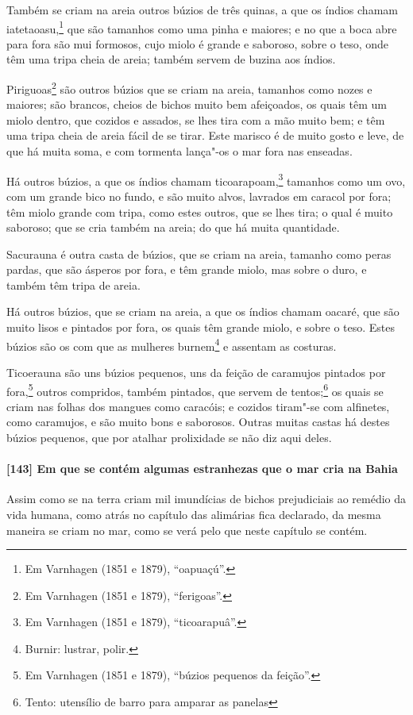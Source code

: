 Também se criam na areia outros búzios de três quinas, a que os índios chamam
iatetaoasu,\footnote{ Em Varnhagen (1851 e 1879), ``oapuaçú''.} que são tamanhos como uma
pinha e maiores; e no que a boca abre para fora são mui formosos, cujo miolo é grande e
saboroso, sobre o teso, onde têm uma tripa cheia de areia; também servem de buzina aos
índios.

Piriguoas\footnote{ Em Varnhagen (1851 e 1879), ``ferigoas''.} são outros búzios que se
criam na areia, tamanhos como nozes e maiores; são brancos, cheios de bichos muito bem
afeiçoados, os quais têm um miolo dentro, que cozidos e assados, se lhes tira com a mão
muito bem; e têm uma tripa cheia de areia fácil de se tirar. Este marisco é de muito gosto
e leve, de que há muita soma, e com tormenta lança"-os o mar fora nas enseadas.

Há outros búzios, a que os índios chamam ticoarapoam,\footnote{ Em Varnhagen (1851 e 1879),
``ticoarapuâ''.} tamanhos como um ovo, com um grande bico no fundo, e são muito alvos,
lavrados em caracol por fora; têm miolo grande com tripa, como estes outros, que se lhes
tira; o qual é muito saboroso; que se cria também na areia; do que há muita quantidade.

Sacurauna é outra casta de búzios, que se criam na areia, tamanho como peras pardas, que
são ásperos por fora, e têm grande miolo, mas sobre o duro, e também têm tripa de areia.

Há outros búzios, que se criam na areia, a que os índios chamam oacaré, que são muito
lisos e pintados por fora, os quais têm grande miolo, e sobre o teso. Estes búzios são os
com que as mulheres burnem\footnote{ Burnir: lustrar, polir.} e assentam as costuras.

Ticoerauna são uns búzios pequenos, uns da feição de caramujos pintados por
fora,\footnote{ Em Varnhagen (1851 e 1879), ``búzios pequenos da feição''.} outros
compridos, também pintados, que servem de tentos;\footnote{ Tento: utensílio de barro para
amparar as panelas} os quais se criam nas folhas dos mangues como
caracóis; e cozidos tiram"-se com alfinetes, como caramujos, e são muito bons e saborosos.
Outras muitas castas há destes búzios pequenos, que por atalhar prolixidade se não diz
aqui deles.

\paragraph{[143] Em que se contém algumas estranhezas que o mar cria na Bahia}\quad
Assim como se na terra criam mil imundícias de bichos prejudiciais ao remédio da vida
humana, como atrás no capítulo das alimárias fica declarado, da mesma maneira se criam no
mar, como se verá pelo que neste capítulo se contém.

